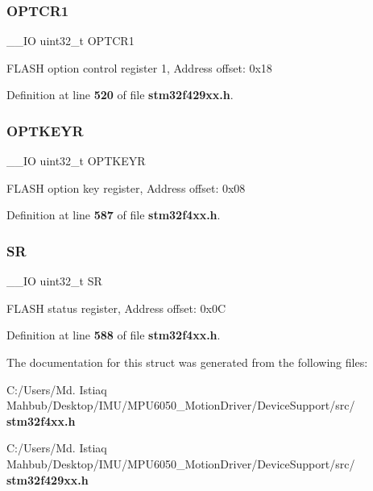 \subsubsection{O\+P\+T\+C\+R1}
{\footnotesize\ttfamily \+\_\+\+\_\+\+IO uint32\+\_\+t O\+P\+T\+C\+R1}

F\+L\+A\+SH option control register 1, Address offset\+: 0x18 

Definition at line \textbf{ 520} of file \textbf{ stm32f429xx.\+h}.

\mbox{\label{structFLASH__TypeDef_afc4900646681dfe1ca43133d376c4423}} 
\subsubsection{O\+P\+T\+K\+E\+YR}
{\footnotesize\ttfamily \+\_\+\+\_\+\+IO uint32\+\_\+t O\+P\+T\+K\+E\+YR}

F\+L\+A\+SH option key register, Address offset\+: 0x08 

Definition at line \textbf{ 587} of file \textbf{ stm32f4xx.\+h}.

\mbox{\label{structFLASH__TypeDef_af6aca2bbd40c0fb6df7c3aebe224a360}} 
\subsubsection{SR}
{\footnotesize\ttfamily \+\_\+\+\_\+\+IO uint32\+\_\+t SR}

F\+L\+A\+SH status register, Address offset\+: 0x0C 

Definition at line \textbf{ 588} of file \textbf{ stm32f4xx.\+h}.



The documentation for this struct was generated from the following files\+:\begin{DoxyCompactItemize}
\item 
C\+:/\+Users/\+Md. Istiaq Mahbub/\+Desktop/\+I\+M\+U/\+M\+P\+U6050\+\_\+\+Motion\+Driver/\+Device\+Support/src/\textbf{ stm32f4xx.\+h}\item 
C\+:/\+Users/\+Md. Istiaq Mahbub/\+Desktop/\+I\+M\+U/\+M\+P\+U6050\+\_\+\+Motion\+Driver/\+Device\+Support/src/\textbf{ stm32f429xx.\+h}\end{DoxyCompactItemize}
